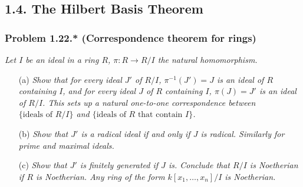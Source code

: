 \documentclass{article}
\begin{document}
\subsection*{1.4. The Hilbert Basis Theorem \\}



\subsubsection*{Problem 1.22.* (Correspondence theorem for rings)}
\emph{Let $I$ be an ideal in a ring $R$, $\pi: R \to R/I$ the natural homomorphism.}
\begin{enumerate}
\item[(a)]
  \emph{Show that for every ideal $J'$ of $R/I$,
  $\pi^{-1}(J') = J$ is an ideal of $R$ containing $I$,
  and for every ideal $J$ of $R$ containing $I$,
  $\pi(J) = J'$ is an ideal of $R/I$.
  This sets up a natural one-to-one correspondence between
  $\{ \text{ideals of $R/I$} \}$ and $\{ \text{ideals of $R$ that contain $I$} \}$.}

\item[(b)]
  \emph{Show that $J'$ is a radical ideal if and only if $J$ is radical.
  Similarly for prime and maximal ideals.}

\item[(c)]
  \emph{Show that $J'$ is finitely generated if $J$ is.
  Conclude that $R/I$ is Noetherian if $R$ is Noetherian.
  Any ring of the form $k[x_1,\ldots,x_n]/I$ is Noetherian.} \\
\end{enumerate}
\end{document}
